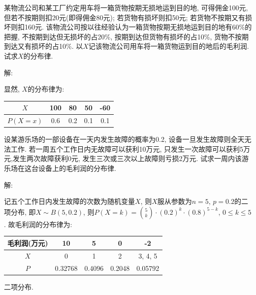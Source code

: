 \documentclass[standard]{ExBook}
\begin{document}
\begin{qitems}
\vspace{-5em}

    \begin{bbox}
    \begin{shaded}
        \qitem
某物流公司和某工厂约定用车将一箱货物按期无损地运到目的地, 可得佣金100元, 但若不按期则扣20元(即得佣金80元); 若货物有损坏则扣50元; 若货物不按期又有损坏则扣160元. 该物流公司按以往经验认为一箱货物按期无损地运到目的地有60\%的把握, 不按期到达但无损坏的占20\%, 按期到达但货物有损坏的占10\%, 货物不按期到达又有损坏的占10\%. 以$X$记该物流公司用车将一箱货物运到目的地后的毛利润. 试求$X$的分布律.
    \end{shaded}
    \end{bbox}

\vspace{-5em}

    \begin{bbox}
解: 

显然, $X$的分布律为: 
\begin{center}
\begin{tabular}{c|c|c|c|c}
\hline
$X$ & 100 & 80 & 50 & -60 \\
\hline
$P(X=x)$ & 0.6 & 0.2 & 0.1 & 0.1 \\
\hline
\end{tabular}
\end{center}
    \end{bbox}

\vspace{-5em}

    \begin{bbox}
    \begin{shaded}
        \qitem
设某游乐场的一部设备在一天内发生故障的概率为0.2, 设备一旦发生故障则全天无法工作. 若一周五个工作日内无故障可以获利10万元, 只发生一次故障可以获利5万元,发生两次故障获利0元, 发生三次或三次以上故障则亏损2万元. 试求一周内该游乐场在这台设备上的毛利润的分布律.
    \end{shaded}
    \end{bbox}

\vspace{-5em}

    \begin{bbox}
解: 

记五个工作日内发生故障的次数为随机变量$X$, 则$X$服从参数为$n=5$, $p=0.2$的二项分布, 即$X\sim B(5,0.2)$, 则$P(X=k)=\binom{5}{k}\cdot(0.2)^k\cdot(0.8)^{5-k}$, $0 \leq k \leq 5$. 故毛利润的分布律为:
\begin{center}
\begin{tabular}{c|c|c|c|c}
\hline
毛利润(万元) & 10 & 5 & 0 & -2 \\
\hline
$X$ & 0 & 1 & 2 & 3, 4, 5 \\
\hline
$P$ & 0.32768 & 0.4096 & 0.2048 & 0.05792 \\
\hline
\end{tabular}
\end{center}
\textcolor{themeColor}{\selectfont {} 二项分布.}
    \end{bbox}


\end{qitems}
\end{document}
